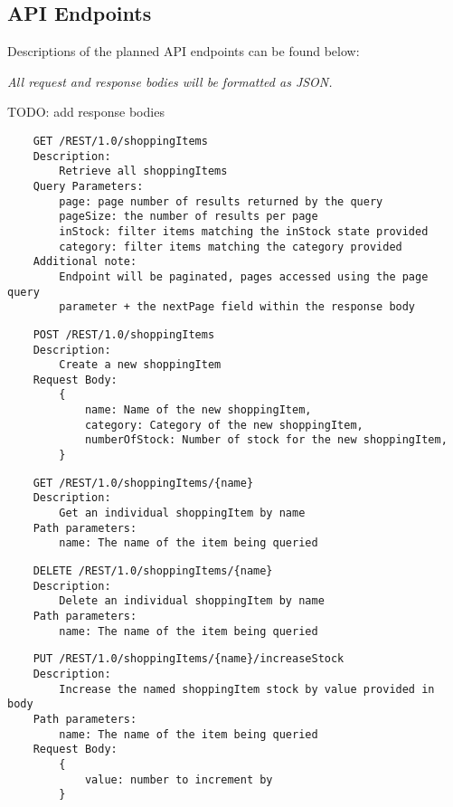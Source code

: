 \subsection{API Endpoints}
Descriptions of the planned API endpoints can be found below: 

\emph{All request and response bodies will be formatted as JSON.}

TODO: add response bodies

\begin{verbatim}
    GET /REST/1.0/shoppingItems
    Description:
        Retrieve all shoppingItems
    Query Parameters:
        page: page number of results returned by the query
        pageSize: the number of results per page
        inStock: filter items matching the inStock state provided
        category: filter items matching the category provided
    Additional note:
        Endpoint will be paginated, pages accessed using the page query 
        parameter + the nextPage field within the response body
\end{verbatim}


\begin{verbatim}
    POST /REST/1.0/shoppingItems
    Description:
        Create a new shoppingItem
    Request Body:
        {
            name: Name of the new shoppingItem,
            category: Category of the new shoppingItem,
            numberOfStock: Number of stock for the new shoppingItem,
        }
\end{verbatim}


\begin{verbatim}
    GET /REST/1.0/shoppingItems/{name}
    Description:
        Get an individual shoppingItem by name
    Path parameters:
        name: The name of the item being queried
\end{verbatim}

\begin{verbatim}
    DELETE /REST/1.0/shoppingItems/{name}
    Description:
        Delete an individual shoppingItem by name
    Path parameters:
        name: The name of the item being queried
\end{verbatim}

\begin{verbatim}
    PUT /REST/1.0/shoppingItems/{name}/increaseStock
    Description:
        Increase the named shoppingItem stock by value provided in body
    Path parameters:
        name: The name of the item being queried
    Request Body:
        {
            value: number to increment by
        }
\end{verbatim}


